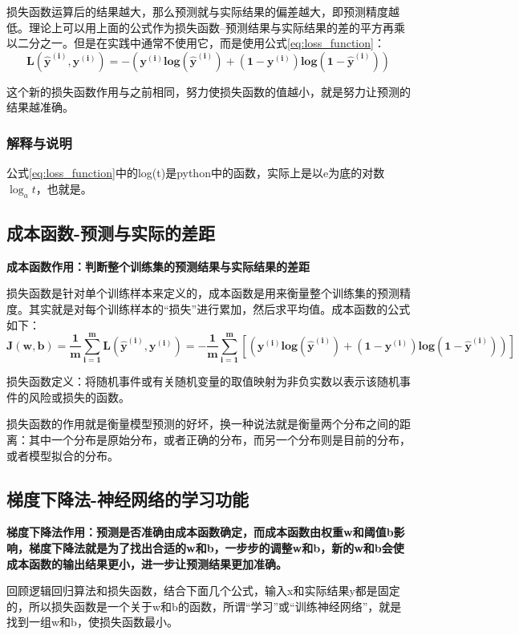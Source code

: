 损失函数运算后的结果越大，那么预测就与实际结果的偏差越大，即预测精度越低。理论上可以用上面的公式作为损失函数--预测结果与实际结果的差的平方再乘以二分之一。但是在实践中通常不使用它，而是使用公式\ref{eq:loss_function}：
\begin{equation}
	\bm{L(\hat{y}^{(i)}, y^{(i)}) = -(y^{(i)}log(\hat{y}^{(i)}) + (1 - y^{(i)})log(1 - \hat{y}^{(i)}))} \label{eq:loss_function}
\end{equation}

这个新的损失函数作用与之前相同，努力使损失函数的值越小，就是努力让预测的结果越准确。

\subsubsection{解释与说明}
公式\ref{eq:loss_function}中的log(t)是python中的函数，实际上是以e为底的对数$\log_at$，也就是。

\subsection{成本函数-预测与实际的差距}
\textbf{成本函数作用：判断整个训练集的预测结果与实际结果的差距}

损失函数是针对单个训练样本来定义的，成本函数是用来衡量整个训练集的预测精度。其实就是对每个训练样本的“损失”进行累加，然后求平均值。成本函数的公式如下：
\begin{equation}
	\bm{J(w,b) = \frac{1}{m}\sum_{i=1}^{m}L(\hat{y}^{(i)}, y^{(i)}) = - \frac{1}{m}\sum_{i=1}^{m}[(y^{(i)}log(\hat{y}^{(i)}) + (1 - y^{(i)})log(1 - \hat{y}^{(i)}))]} \label{eq:cost}
\end{equation}

损失函数定义：将随机事件或有关随机变量的取值映射为非负实数以表示该随机事件的风险或损失的函数。

损失函数的作用就是衡量模型预测的好坏，换一种说法就是衡量两个分布之间的距离：其中一个分布是原始分布，或者正确的分布，而另一个分布则是目前的分布，或者模型拟合的分布。

\subsection{梯度下降法-神经网络的学习功能}
\textbf{梯度下降法作用：预测是否准确由成本函数确定，而成本函数由权重w和阈值b影响，梯度下降法就是为了找出合适的w和b，一步步的调整w和b，新的w和b会使成本函数的输出结果更小，进一步让预测结果更加准确。}

回顾逻辑回归算法和损失函数，结合下面几个公式，输入x和实际结果y都是固定的，所以损失函数是一个关于w和b的函数，所谓“学习”或“训练神经网络”，就是找到一组w和b，使损失函数最小。

